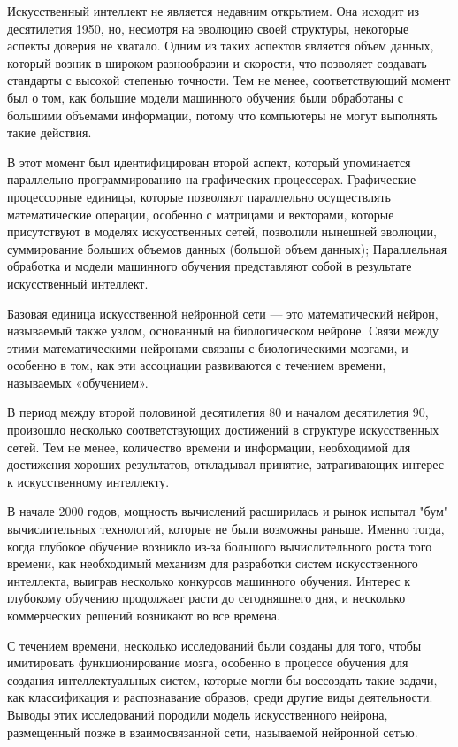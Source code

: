 Искусственный интеллект не является недавним открытием. 
 Она исходит из десятилетия 1950, но, 
 несмотря на эволюцию своей структуры,
 некоторые аспекты доверия не хватало.
 Одним из таких аспектов является объем данных,
 который возник в широком разнообразии и скорости,
 что позволяет создавать стандарты с высокой степенью точности. 
 Тем не менее, соответствующий момент был о том,
 как большие модели машинного обучения были обработаны с большими объемами информации,
 потому что компьютеры не могут выполнять такие действия. 

 В этот момент был идентифицирован второй аспект,
 который упоминается параллельно программированию на графических процессерах.
 Графические процессорные единицы,
 которые позволяют параллельно осуществлять математические операции, 
 особенно с матрицами и векторами,
 которые присутствуют в моделях искусственных сетей, 
 позволили нынешней эволюции,
 суммирование больших объемов данных (большой объем данных);
 Параллельная обработка и модели машинного обучения 
 представляют собой в результате искусственный интеллект. 

 Базовая единица искусственной нейронной сети — это математический нейрон, называемый также узлом, 
 основанный на биологическом нейроне. Связи между этими математическими нейронами связаны с биологическими мозгами,
 и особенно в том, как эти ассоциации развиваются с течением времени, называемых «обучением».

 В период между второй половиной десятилетия 80 и началом десятилетия 90,
 произошло несколько соответствующих достижений в структуре искусственных сетей. 
 Тем не менее, количество времени и информации, необходимой для достижения хороших результатов, 
 откладывал принятие, затрагивающих интерес к искусственному интеллекту.

 В начале 2000 годов, мощность вычислений расширилась и рынок испытал "бум" вычислительных технологий, которые не были возможны раньше. 
 Именно тогда, когда глубокое обучение возникло из-за большого вычислительного роста того времени, 
 как необходимый механизм для разработки систем искусственного интеллекта, выиграв несколько конкурсов машинного обучения.
 Интерес к глубокому обучению продолжает расти до сегодняшнего дня, и несколько коммерческих решений возникают во все времена.

 С течением времени, несколько исследований были созданы для того, чтобы имитировать функционирование мозга,
 особенно в процессе обучения для создания интеллектуальных систем, 
 которые могли бы воссоздать такие задачи, как классификация и распознавание образов, среди другие виды деятельности.
 Выводы этих исследований породили модель искусственного нейрона, размещенный позже в взаимосвязанной сети, называемой нейронной сетью.


